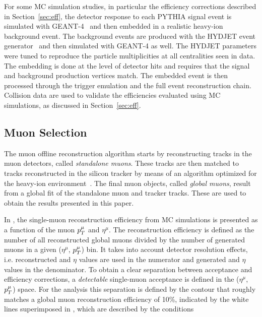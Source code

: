 For some MC simulation studies, in particular the efficiency
corrections described in Section~\ref{sec:eff}, the detector response
to each PYTHIA signal event is simulated with
GEANT-4~\cite{Agostinelli:2002hh} and then embedded in a realistic
heavy-ion background event. The background events are produced with
the HYDJET event generator~\cite{Lokhtin:2005px} and then simulated
with GEANT-4 as well. The HYDJET parameters were tuned to
reproduce the particle multiplicities at all centralities seen in
data. The embedding is done at the level of detector hits and requires
that the signal and background production vertices match. The embedded
event is then processed through the trigger emulation and the full
event reconstruction chain. Collision data are used to validate the
efficiencies evaluated using MC simulations, as discussed in
Section~\ref{sec:eff}.

\subsection{Muon Selection}
\label{sec:muon-sel}

The muon offline reconstruction algorithm starts by reconstructing
tracks in the muon detectors, called \emph{standalone muons}. These
tracks are then matched to tracks reconstructed in the silicon tracker
by means of an algorithm optimized for the heavy-ion
environment~\cite{D'Enterria:2007xr,Roland:2006kz}. The final muon
objects, called \emph{global muons}, result from a global fit of the
standalone muon and tracker tracks. These are used to obtain the
results presented in this paper.

In , the single-muon reconstruction efficiency
from MC simulations is presented as a function of the muon $p_T^\mu$
and $\eta^{\mu}$. The reconstruction efficiency is defined as the
number of all reconstructed global muons divided by the number of
generated muons in a given ($\eta^{\mu}$, $p_T^{\mu}$) bin. It takes
into account detector resolution effects, i.e. reconstructed \pt and
$\eta$ values are used in the numerator and generated \pt and $\eta$
values in the denominator. To obtain a clear separation between
acceptance and efficiency corrections, a \emph{detectable} single-muon
acceptance is defined in the ($\eta^{\mu}$, $p_T^{\mu}$) space. For
the \Jpsi analysis this separation is defined by the contour that
roughly matches a global muon reconstruction efficiency of 10\%,
indicated by the white lines superimposed in ,
which are described by the conditions
  
